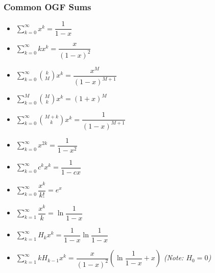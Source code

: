 \subsubsection*{Common OGF Sums}
\begin{itemize}
    \item $\displaystyle \sum_{k = 0}^{\infty} x^k = \dfrac{1}{1 - x}$
    \item $\displaystyle \sum_{k = 0}^{\infty} k x^k = \dfrac{x}{(1 - x)^2}$
    \item $\displaystyle \sum_{k = 0}^{\infty} \binom{k}{M} x^k = \dfrac{x^M}{(1 - x)^{M + 1}}$
    \item $\displaystyle \sum_{k = 0}^{M} \binom{M}{k} x^k = (1 + x)^M$
    \item $\displaystyle \sum_{k = 0}^{\infty} \binom{M + k}{k} x^k = \dfrac{1}{(1 - x)^{M + 1}}$
    \item $\displaystyle \sum_{k = 0}^{\infty} x^{2k} = \dfrac{1}{1 - x^2}$
    \item $\displaystyle \sum_{k = 0}^{\infty} c^k x^k = \dfrac{1}{1 - cx}$
    \item $\displaystyle \sum_{k = 0}^{\infty} \dfrac{x^k}{k!} = e^x$
    \item $\displaystyle \sum_{k = 1}^{\infty} \dfrac{x^k}{k} = \ln \dfrac{1}{1 - x}$
    \item $\displaystyle \sum_{k = 1}^{\infty} H_k x^k = \dfrac{1}{1 - x} \ln \dfrac{1}{1 - x}$
    \item $\displaystyle \sum_{k = 1}^{\infty} k H_{k - 1} x^k = \dfrac{x}{(1 - x)^2} \left(\ln \dfrac{1}{1 - x} + x\right)$ \quad \textit{(Note: $H_0 = 0$)}
\end{itemize}

